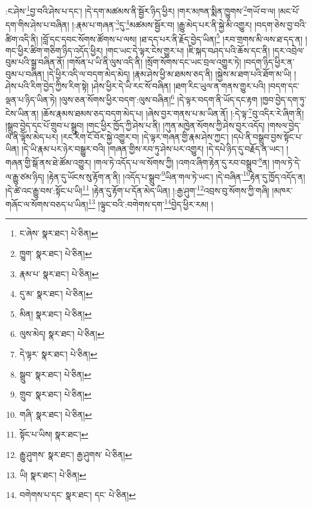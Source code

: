 :ང་ཤེས་\footnote{ང་ཞེས་  སྣར་ཐང་།  པེ་ཅིན། }བྱ་བའི་ཤེས་པ་དང་། །དེ་དག་མཚམས་ནི་སྦྱོར་ཉིད་ཕྱིར། །གར་མཁན་སྨིན་ཁྱུགས་\footnote{ཁྱུག་  སྣར་ཐང་།  པེ་ཅིན། }གཡོ་བ་ལ། །མང་པོ་དག་གིས་ཤེས་པ་བཞིན། །:རྣམ་པ་གཞན་\footnote{རྣམ་པ་  སྣར་ཐང་།  པེ་ཅིན། }དུ་\footnote{དུ་མ་  སྣར་ཐང་།  པེ་ཅིན། }མཚམས་སྦྱོར་བ། །རྒྱུ་མེད་པར་ནི་སྐྱེ་མི་འགྱུར། །བདག་ཅེས་བྱ་བའི་ཚིག་འདི་ནི། །བློ་དང་དབང་སོགས་ཚོགས་པ་ལས། །ཐ་དད་པར་ནི་རྗོད་བྱེད་ཡིན།\footnote{མིན།  སྣར་ཐང་།  པེ་ཅིན། } །རབ་གྲགས་མི་ལས་ཐ་དད་ན། །གང་ཕྱིར་ཚིག་གཅིག་ཉིད་འདོད་ཕྱིར། །གང་ཡང་དེ་ལྟར་ངེས་གྱུར་པ། །ཇི་སྐད་བཤད་པའི་ཆོས་དང་ནི། །དར་འབྲེལ་བུམ་པའི་སྒྲ་བཞིན་ནོ། །གསོན་པ་ཡི་ནི་ལུས་འདི་ནི། །སྲོག་སོགས་དང་ཡང་བྲལ་འགྱུར་ཏེ། །བདག་ཉིད་ཕྱིར་ན་བུམ་པ་བཞིན། །དེ་ཕྱིར་འདི་ལ་བདག་མེད་མེད། །རྣམ་ཤེས་ཕྱི་མ་ཐམས་ཅད་ནི། །སྐྱེས་མ་ཐག་པའི་ཐོག་མ་ཡི། །ཤེས་པའི་རིག་བྱེད་ཀྱིས་རིག་སྟེ། །ཤེས་ཕྱིར་དེ་ཡི་རང་སོ་བཞིན། །ཐག་རིང་ཡུལ་ན་གནས་གྱུར་པའི། །བདག་དང་ལྡན་པ་ཉིད་ཡིན་ཏེ། །ལུས་ཅན་སོགས་ཕྱིར་བདག་:ལུས་བཞིན།\footnote{ལུས་མེད།  སྣར་ཐང་།  པེ་ཅིན། } །དེ་ལྟར་བདག་ནི་ཡོད་དང་རྟག །ཁྱབ་བྱེད་དག་ཏུ་ངེས་ཡིན་ན། །ཆོས་རྣམས་ཐམས་ཅད་བདག་མེད་པ། །ཞེས་བྱར་གནས་པ་མ་ཡིན་ནོ། །:དེ་ལྟ་\footnote{དེ་ལྟར་  སྣར་ཐང་།  པེ་ཅིན། }བུ་འདིར་རེ་ཞིག་ནི། །སྒྲུབ་བྱེད་དང་པོ་གྲུབ་པ་སྒྲུབ། །གང་ཕྱིར་ཁྱོད་ཀྱི་ཤེས་པ་ནི། །ཀུན་མཁྱེན་སོགས་ཀྱི་ཤེས་བྱར་འདོད། །གསལ་བྱེད་ལ་ནི་ལྟོས་མེད་པར། །རང་རིག་ངོ་བོར་སྐྱེ་འགྱུར་བ། །དེ་ལྟར་གཞན་གྱི་རྣམ་ཤེས་ཀྱང་། །དཔེ་ནི་བསྒྲུབ་བྱས་སྟོང་པ་ཡིན། །དེ་ཡི་རྣམ་པར་ཉེར་བསྒྱུར་བའི། །གཞན་གྱིས་རབ་ཏུ་ཤེས་པར་འགྱུར། །དེ་དཔེ་ཉིད་དུ་བརྗོད་ན་ཡང་། །གཞན་གྱི་སྒོ་ནས་ཐེ་ཚོམ་འགྱུར། །གལ་ཏེ་འདོད་པ་ལ་སོགས་ཀྱི། །འགའ་ཞིག་རྟེན་དུ་རབ་བསྒྲུབ་\footnote{སྒྲུབ་  སྣར་ཐང་།  པེ་ཅིན། }ན། །གལ་ཏེ་དེ་ལ་རྒྱུ་ཙམ་ཉིད། །རྟེན་དུ་ཡོངས་སུ་རྟོག་ན་ནི། །འདོད་པ་སྒྲུབ་\footnote{གྲུབ་  སྣར་ཐང་།  པེ་ཅིན། }ཡིན་གལ་ཏེ་ཡང་། །དེ་བཞིན་\footnote{གཞི་  སྣར་ཐང་།  པེ་ཅིན། }རྟེན་དུ་ཁྱོད་འདོད་ན། །དེ་ཚེ་འང་རྒྱུ་བས་:སྟོང་པ་ཡི།\footnote{སྟོང་པ་ཡིས།  སྣར་ཐང་། } །རྟེན་དུ་རྟོག་པ་དོན་མེད་ཡིན། །:རྒྱ་ཤུག་\footnote{རྒྱུ་ཤུགས་  སྣར་ཐང་། རྒྱ་ཤུགས་  པེ་ཅིན། }འབྲས་བུ་སོགས་ཀྱི་གཞི། །མཁར་གཞོང་ལ་སོགས་བཅད་པ་ཡིན།\footnote{ཡི།  སྣར་ཐང་།  པེ་ཅིན། } །ལྟུང་བའི་:བགེགས་དག་\footnote{བགེགས་པ་དང་  སྣར་ཐང་། དང་  པེ་ཅིན། }བྱེད་ཕྱིར་རམ། །

